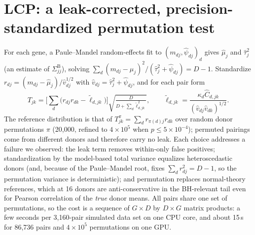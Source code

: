\documentclass[10pt,letterpaper]{article}
\theoremstyle{definition}
\newcommand{\SB}{\Sigma^{\mathrm{B}}}
\begin{document}
\section{LCP: a leak-corrected, precision-standardized permutation test}

For each gene, a Paule--Mandel random-effects fit to $(m_{dj},\hat\psi_{dj})_d$ gives $\hat\mu_j$ and $\hat\tau^2_j$ (an estimate of $\SB_{jj}$), solving $\sum_d(m_{dj}-\hat\mu_j)^2/(\hat\tau_j^2+\hat\psi_{dj})=D-1$. Standardize $r_{dj}=(m_{dj}-\hat\mu_j)/\hat v_{dj}^{1/2}$ with $\hat v_{dj}=\hat\tau^2_j+\hat\psi_{dj}$, and for each pair form
\[
T_{jk}=\Big[\sum_d\big(r_{dj}r_{dk}-\tilde\ell_{d,jk}\big)\Big]\sqrt{\tfrac{D}{D+\sum_d\tilde\ell_{d,jk}^2}},\qquad \tilde\ell_{d,jk}=\frac{\kappa_d\hat C_{d,jk}}{(\hat v_{dj}\hat v_{dk})^{1/2}}.
\]
The reference distribution is that of $T^\pi_{jk}=\sum_dr_{\pi(d)j}r_{dk}$ over random donor permutations $\pi$ (20{,}000, refined to $4\times10^5$ when $p\le5\times10^{-4}$); permuted pairings come from different donors and therefore carry no leak. Each choice addresses a failure we observed: the leak term removes within-only false positives; standardization by the model-based total variance equalizes heteroscedastic donors (and, because of the Paule--Mandel root, fixes $\sum_dr_{dj}^2=D-1$, so the permutation variance is deterministic); and permutation replaces normal-theory references, which at 16 donors are anti-conservative in the BH-relevant tail even for Pearson correlation of the \emph{true} donor means. All pairs share one set of permutations, so the cost is a sequence of $G\times D$ by $D\times G$ matrix products: a few seconds per 3{,}160-pair simulated data set on one CPU core, and about 15\,s for 86{,}736 pairs and $4\times10^5$ permutations on one GPU.
\end{document}
